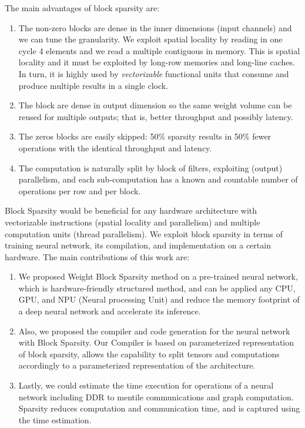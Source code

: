 \documentclass[conference]{IEEEtran}
\begin{document}
The main advantages of block sparsity are:

\begin{enumerate}
  \item The non-zero blocks are dense in the inner dimensions (input
    channels) and we can tune the granularity. We exploit spatial
    locality by reading in one cycle 4 elements and we read a multiple
    contiguous in memory. This is spatial locality and it must be
    exploited by long-row memories and long-line caches. In turn, it
    is highly used by {\em vectorizable} functional units that consume
    and produce multiple results in a single clock.
  \item The block are dense in output dimension so the same weight
    volume can be reused for multiple outputs; that is, better
    throughput and possibly latency.
   \item The zeros blocks are easily skipped: 50\% sparsity results in
     50\% fewer operations with the identical throughput and latency.
  \item The computation is naturally split by block of filters,
    exploiting (output) parallelism, and each sub-computation has a
    known and countable number of operations per row and per block.
\end{enumerate}


Block Sparsity would be beneficial for any hardware architecture with
vectorizable instructions (spatial locality and parallelism) and
multiple computation units (thread parallelism). We exploit block
sparsity in terms of training neural network, its compilation, and
implementation on a certain hardware. The main contributions of this
work are:

\begin{enumerate}
\item We proposed Weight Block Sparsity method on a pre-trained neural
  network, which is hardware-friendly structured method, and can be
  applied any CPU, GPU, and NPU (Neural processing Unit) and reduce
  the memory footprint of a deep neural network and accelerate its
  inference.

\item Also, we proposed the compiler and code generation for the
  neural network with Block Sparsity.  Our Compiler is based on
  parameterized representation of block sparsity, allows the
  capability to split tensors and computations accordingly to a
  parameterized representation of the architecture.

\item Lastly, we could estimate the time execution for operations of a
  neural network including DDR to mentile communications and graph
  computation.  Sparsity reduces computation and communication time,
  and is captured using the time estimation.
\end{enumerate}
\end{document}
